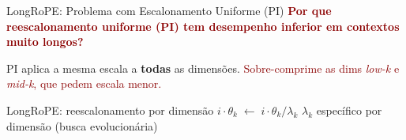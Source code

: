 \documentclass[aspectratio=169, xcolor=dvipsnames]{beamer}
\begin{document}
  \begin{frame}{LongRoPE: Problema com Escalonamento Uniforme (PI)}
    \textcolor{DarkRed}{\textbf{Por que reescalonamento uniforme (PI) tem desempenho inferior em contextos muito longos?}}

    \vspace{0.3em}
    \centering

    \smallskip
    PI aplica a mesma escala a \textbf{todas} as dimensões.
    \textcolor{DarkRed}{Sobre-comprime as dims \textit{low-k} e \textit{mid-k}, que pedem escala menor.}

    \begin{block}{LongRoPE: reescalonamento por dimensão}
      $i \cdot \theta_k \;\leftarrow\; i \cdot \theta_k / \lambda_k$ \qquad $\lambda_k$ específico por dimensão (busca evolucionária)
    \end{block}
  \end{frame}
\end{document}

